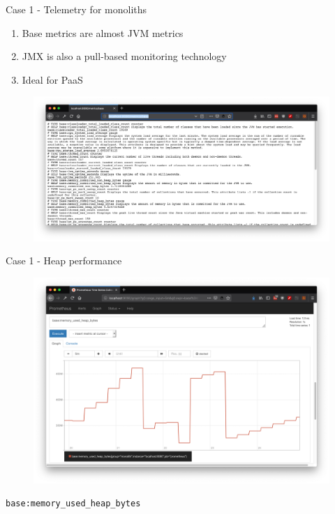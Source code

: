 \documentclass{beamer}
\begin{document}
\begin{frame}{Case 1 - Telemetry for monoliths}

\begin{enumerate}
	\item Base metrics are almost JVM metrics
	\item JMX is also a pull-based monitoring technology
	\item Ideal for PaaS
\end{enumerate}

\begin{figure}
	\centering
	\includegraphics[width=\linewidth]{Images/base-metrics}
\end{figure}



\end{frame}

\begin{frame}{Case 1 - Heap performance}

\begin{figure}
	\centering
	\includegraphics[width=0.8\linewidth]{Images/mono1}
\end{figure}
\lstinline|base:memory_used_heap_bytes|
\end{frame}
\end{document}
